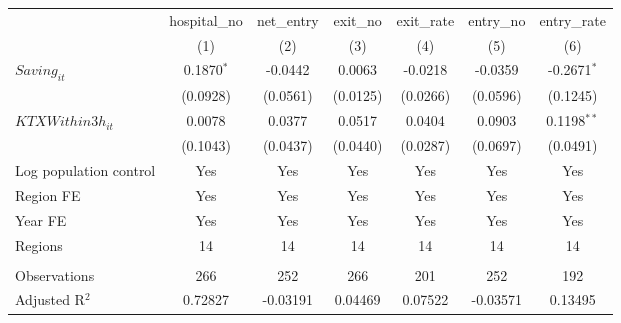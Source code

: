\begingroup
\centering
\begin{tabular}{lcccccc}
   \toprule
                          & hospital\_no  & net\_entry  & exit\_no  & exit\_rate  & entry\_no  & entry\_rate \\    
                          & (1)           & (2)         & (3)       & (4)         & (5)        & (6)\\  
   \midrule 
   $Saving_{it}$          & 0.1870$^{*}$  & -0.0442     & 0.0063    & -0.0218     & -0.0359    & -0.2671$^{*}$\\   
                          & (0.0928)      & (0.0561)    & (0.0125)  & (0.0266)    & (0.0596)   & (0.1245)\\   
   $KTXWithin3h_{it}$     & 0.0078        & 0.0377      & 0.0517    & 0.0404      & 0.0903     & 0.1198$^{**}$\\   
                          & (0.1043)      & (0.0437)    & (0.0440)  & (0.0287)    & (0.0697)   & (0.0491)\\   
   Log population control & Yes           & Yes         & Yes       & Yes         & Yes        & Yes\\  
   Region FE              & Yes           & Yes         & Yes       & Yes         & Yes        & Yes\\  
   Year FE                & Yes           & Yes         & Yes       & Yes         & Yes        & Yes\\  
   Regions                & 14            & 14          & 14        & 14          & 14         & 14\\  
    \\
   Observations           & 266           & 252         & 266       & 201         & 252        & 192\\  
   Adjusted R$^2$         & 0.72827       & -0.03191    & 0.04469   & 0.07522     & -0.03571   & 0.13495\\  
   \bottomrule
\end{tabular}
\par\endgroup
